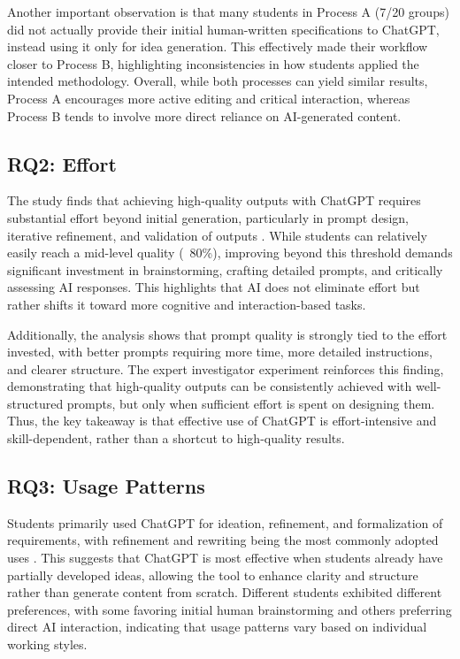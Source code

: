 Another important observation is that many students in Process A (7/20 groups) did not actually provide their initial human-written specifications to ChatGPT, instead using it only for idea generation. This effectively made their workflow closer to Process B, highlighting inconsistencies in how students applied the intended methodology. Overall, while both processes can yield similar results, Process A encourages more active editing and critical interaction, whereas Process B tends to involve more direct reliance on AI-generated content.

\subsection{RQ2: Effort}
The study finds that achieving high-quality outputs with ChatGPT requires substantial effort beyond initial generation, particularly in prompt design, iterative refinement, and validation of outputs . While students can relatively easily reach a mid-level quality (~80\%), improving beyond this threshold demands significant investment in brainstorming, crafting detailed prompts, and critically assessing AI responses. This highlights that AI does not eliminate effort but rather shifts it toward more cognitive and interaction-based tasks.

Additionally, the analysis shows that prompt quality is strongly tied to the effort invested, with better prompts requiring more time, more detailed instructions, and clearer structure. The expert investigator experiment reinforces this finding, demonstrating that high-quality outputs can be consistently achieved with well-structured prompts, but only when sufficient effort is spent on designing them. Thus, the key takeaway is that effective use of ChatGPT is effort-intensive and skill-dependent, rather than a shortcut to high-quality results.

\subsection{RQ3: Usage Patterns}
Students primarily used ChatGPT for ideation, refinement, and formalization of requirements, with refinement and rewriting being the most commonly adopted uses . This suggests that ChatGPT is most effective when students already have partially developed ideas, allowing the tool to enhance clarity and structure rather than generate content from scratch. Different students exhibited different preferences, with some favoring initial human brainstorming and others preferring direct AI interaction, indicating that usage patterns vary based on individual working styles.

